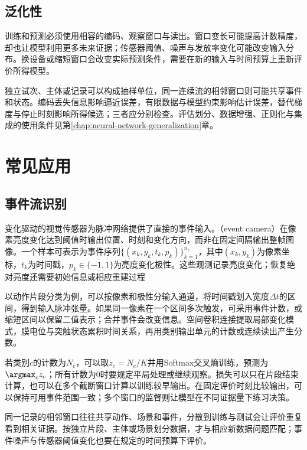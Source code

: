 \subsection{泛化性}
\label{sec:snn-generalization}

训练和预测必须使用相容的编码、观察窗口与读出。窗口变长可能提高计数精度，却也让模型利用更多未来证据；传感器阈值、噪声与发放率变化可能改变输入分布。换设备或缩短窗口会改变实际预测条件，需要在新的输入与时间预算上重新评价所得模型。

独立试次、主体或记录可以构成抽样单位，同一连续流的相邻窗口则可能共享事件和状态。编码丢失信息影响逼近误差，有限数据与模型约束影响估计误差，替代梯度与停止时刻影响所得候选；三者应分别检查。评估划分、数据增强、正则化与集成的使用条件见第\ref{chap:neural-network-generalization}章。

\section{常见应用}
\label{sec:snn-applications}

\subsection{事件流识别}
\label{sec:snn-event-recognition}

变化驱动的视觉传感器为脉冲网络提供了直接的事件输入。（event camera）在像素亮度变化达到阈值时输出位置、时刻和变化方向，而非在固定间隔输出整帧图像。一个样本可表示为事件序列$\{(x_k,y_k,t_k,p_k)\}_{k=1}^{n_e}$，其中$(x_k,y_k)$为像素坐标，$t_k$为时间戳，$p_k\in\{-1,1\}$为亮度变化极性。这些观测记录亮度变化；恢复绝对亮度还需要初始信息或相应重建过程

以动作片段分类为例，可以按像素和极性分输入通道，将时间戳划入宽度$\Delta t$的区间，得到输入脉冲张量。如果同一像素在一个区间多次触发，可采用事件计数，或缩短区间以保留二值表示；合并事件会改变信息。空间卷积连接提取局部变化模式，膜电位与突触状态累积时间关系，再用类别输出单元的计数或连续读出产生分数。

若类别$c$的计数为$N_c$，可以取$z_c=N_c/K$并用Softmax交叉熵训练，预测为$\argmax_c z_c$；所有计数为0时要规定平局处理或继续观察。损失可以只在片段结束计算，也可以在多个截断窗口计算以训练较早输出。在固定评价时刻比较输出，可以保持可用事件范围一致；多个窗口的监督则让模型在不同证据量下练习决策。

同一记录的相邻窗口往往共享动作、场景和事件，分散到训练与测试会让评价重复看到相关证据。按独立片段、主体或场景划分数据，才与相应新数据问题匹配；事件噪声与传感器阈值变化也要在规定的时间预算下评价。

